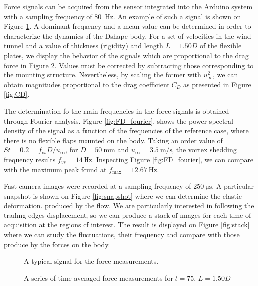 \documentclass[12pt,a4paper,twocolumn]{article}
\begin{document}
Force signals can be acquired from the sensor integrated into the Arduino  system with a sampling frequency of \SI{80}{\hertz}. An example of such a signal is shown on Figure \ref{fig:FD_typical}. A dominant frequency and a mean value can be determined in order to characterize the dynamics of the Dshape body. For a set of velocities in the wind tunnel and a value of thickness (rigidity) and length $L = 1.50 D$ of the flexible plates, we   display the behavior of the signals which are proportional to the drag force in Figure \ref{fig:FD_series_crude}. Values must be corrected by subtracting those corresponding to the mounting structure. Nevertheless, by scaling the former with $u_\infty^2$, we can obtain magnitudes proportional to the drag coefficient $C_D$ as presented in Figure \ref{fig:CD}.

The determination fo the main frequencies in the force signals is obtained through Fourier analysis. Figure \ref{fig:FD_fourier}. shows the power spectral density of the signal as a function of the frequencies of the reference case, where there is no flexible flaps mounted on the body. Taking an order value of $St=0.2=f_{vs}D/u_\infty$, for $D=\SI{50}{\milli\meter}$ and $u_\infty=\SI{3.5}{\meter/\second}$, the vortex shedding frequency results $f_{vs}=\SI{14}{\hertz}$. Inspecting Figure \ref{fig:FD_fourier}, we can compare with the maximum peak found at $f_{\max}=\SI{12.67}{\hertz}$.

Fast camera images were recorded at a sampling frequency of $ \SI{250}{\micro\second}$. A particular snapshot is shown on Figure \ref{fig:snapshot} where we can determine the elastic deformation. produced by the flow. We are particularly interested in following the trailing edges displacement, so we can produce a stack of images for each time of acquisition at the regions of interest. The result is displayed on Figure \ref{fig:stack} where we can study the fluctuations, their frequency and compare with those produce by the forces on the body.

	\begin{figure}
	\centering\resizebox{.495\textwidth}{!}{%
		}
	\caption{A typical signal for the force measurements.}\label{fig:FD_typical}
\end{figure}
 
	\begin{figure}
			\centering\resizebox{.495\textwidth}{!}{%
		}
		\caption{A series of time averaged force measurements for $t=75$, $L=1.50 D$}\label{fig:FD_series_crude}
	\end{figure}
	
\end{document}
